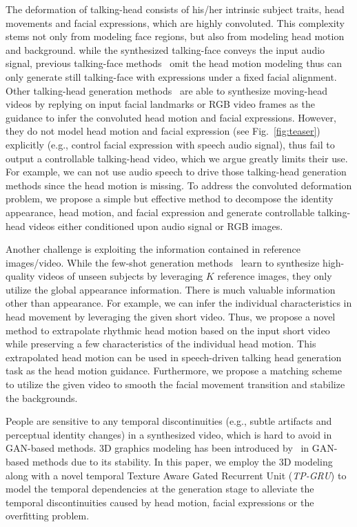 \documentclass[runningheads]{llncs}
\begin{document}
The deformation of talking-head consists of his/her intrinsic subject traits, head movements and facial expressions, which are highly convoluted. This complexity stems not only from modeling face regions, but also from modeling head motion and background. while the synthesized talking-face conveys the input audio signal, previous talking-face methods~\cite{Chung18b,wiles2018x2face,zhou2019talking,chen2018lip,ijcai2019-129,chen2019hierarchical} omit the head motion modeling thus can only generate still talking-face with expressions under a fixed facial alignment. Other talking-head generation methods~\cite{zakharov2019few,wang2018fewshotvid2vid,wang2018vid2vid,wang2018high,wiles2018x2face} are able to synthesize moving-head videos by replying on input facial landmarks or RGB video frames as the guidance to infer the convoluted head motion and facial expressions. However, they do not model head motion and facial expression (see Fig.~\ref{fig:teaser}) explicitly (e.g., control facial expression with speech audio signal), thus fail to output a controllable talking-head video, which we argue greatly limits their use. For example, we can not use audio speech to drive those talking-head generation methods since the head motion is missing. To address the convoluted deformation problem, we propose a simple but effective method to decompose the identity appearance, head motion, and facial expression and generate controllable talking-head videos either conditioned upon audio signal or RGB images.     

Another challenge is exploiting the information contained in reference images/video. While the few-shot generation methods~\cite{zakharov2019few,wang2018fewshotvid2vid,liu2019few} learn to synthesize high-quality videos of unseen subjects by leveraging $K$ reference images, they only utilize the global appearance information. There is much valuable information other than appearance. For example, we can infer the individual characteristics in head movement by leveraging the given short video. Thus, we propose a novel method to extrapolate rhythmic head motion based on the input short video while preserving a few characteristics of the individual head motion. This extrapolated head motion can be used in speech-driven talking head generation task as the head motion guidance. Furthermore, we propose a matching scheme to utilize the given video to smooth the facial movement transition and stabilize the backgrounds.

People are sensitive to any temporal discontinuities (e.g., subtle artifacts and perceptual identity changes) in a synthesized video, which is hard to avoid in GAN-based methods. 3D graphics modeling has been introduced by~\cite{Fried19,kim2018deep} in GAN-based methods due to its stability. In this paper, we employ the 3D modeling along with a novel temporal Texture Aware Gated Recurrent Unit (\textit{TP-GRU}) to model the temporal dependencies at the generation stage to alleviate the temporal discontinuities caused by head motion, facial expressions or the overfitting problem.
\end{document}
